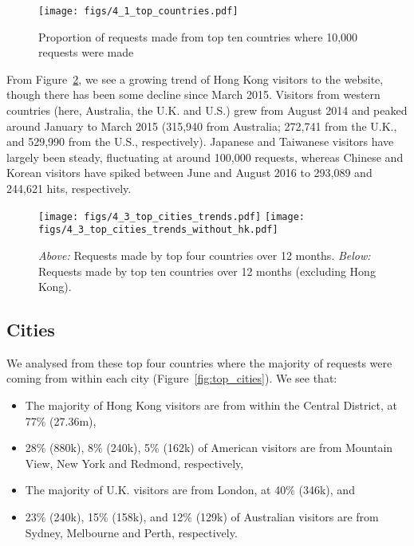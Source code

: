 \documentclass[12pt,titlepage]{article}
\begin{document}
\begin{figure}[h]
  \centering
  \texttt{[image: figs/4\_1\_top\_countries.pdf]}
  \caption[Proportion of requests made from top ten countries]{Proportion of requests made from top ten countries where 10,000 requests were made}
  \label{fig:top_countries}
\end{figure}

From Figure~\ref{fig:4_3_top_cities_trends}, we see a growing trend of Hong Kong visitors to the website, though there has been some decline since March 2015. Visitors from western countries (here, Australia, the U.K. and U.S.) grew from August 2014 and peaked around January to March 2015 (315,940 from Australia; 272,741 from the U.K., and 529,990 from the U.S., respectively). Japanese and Taiwanese visitors have largely been steady, fluctuating at around 100,000 requests, whereas Chinese and Korean visitors have spiked between June and August 2016 to 293,089 and 244,621 hits, respectively.

\begin{figure}[thbp]
  \centering
  \texttt{[image: figs/4\_3\_top\_cities\_trends.pdf]}
  \texttt{[image: figs/4\_3\_top\_cities\_trends\_without\_hk.pdf]}
  \caption[Requests made by top four and ten countries over 12 months]{\textit{Above:} Requests made by top four countries over 12 months. \textit{Below:} Requests made by top ten countries over 12 months (excluding Hong Kong).}
  \label{fig:4_3_top_cities_trends}
\end{figure}

\subsection{Cities}

We analysed from these top four countries where the majority of requests were coming from within each city (Figure~\ref{fig:top_cities}). We see that:

\begin{itemize}
  \item The majority of Hong Kong visitors are from within the Central District, at 77\% (27.36m),
  \item 28\% (880k), 8\% (240k), 5\% (162k) of American visitors are from Mountain View, New York and Redmond, respectively,
  \item The majority of U.K. visitors are from London, at 40\% (346k), and
  \item 23\% (240k), 15\% (158k), and 12\% (129k) of Australian visitors are from Sydney, Melbourne and Perth, respectively.
\end{itemize}
\end{document}
